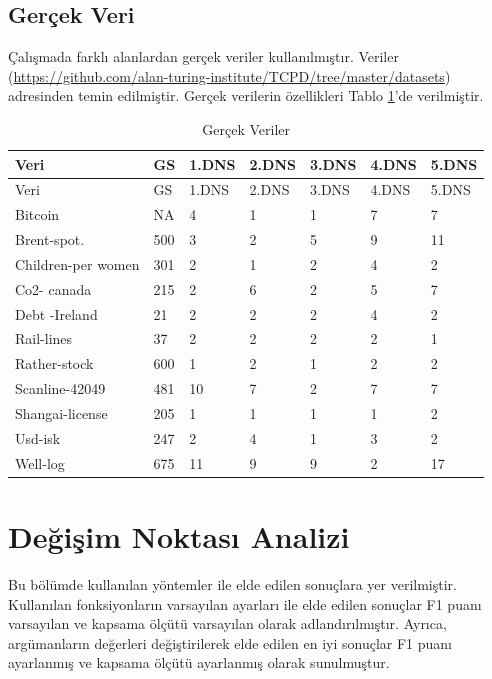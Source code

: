 \documentclass[12pt,twoside]{deuthesis}
\begin{document}
\hypertarget{geruxe7ek-veri}{%
\subsection{Gerçek Veri}\label{geruxe7ek-veri}}

Çalışmada farklı alanlardan gerçek veriler kullanılmıştır. Veriler (\url{https://github.com/alan-turing-institute/TCPD/tree/master/datasets}) adresinden temin edilmiştir. Gerçek verilerin özellikleri Tablo \ref{tab:ngercek}'de verilmiştir.

\begin{longtable}[]{@{}lllllll@{}}
\caption{\label{tab:ngercek} Gerçek Veriler}\tabularnewline
\toprule\noalign{}
Veri & GS & 1.DNS & 2.DNS & 3.DNS & 4.DNS & 5.DNS \\
\midrule\noalign{}
\endfirsthead
\toprule\noalign{}
Veri & GS & 1.DNS & 2.DNS & 3.DNS & 4.DNS & 5.DNS \\
\midrule\noalign{}
\endhead
\bottomrule\noalign{}
\endlastfoot
Bitcoin & NA & 4 & 1 & 1 & 7 & 7 \\
Brent-spot. & 500 & 3 & 2 & 5 & 9 & 11 \\
Children-per women & 301 & 2 & 1 & 2 & 4 & 2 \\
Co2- canada & 215 & 2 & 6 & 2 & 5 & 7 \\
Debt -Ireland & 21 & 2 & 2 & 2 & 4 & 2 \\
Rail-lines & 37 & 2 & 2 & 2 & 2 & 1 \\
Rather-stock & 600 & 1 & 2 & 1 & 2 & 2 \\
Scanline-42049 & 481 & 10 & 7 & 2 & 7 & 7 \\
Shangai-license & 205 & 1 & 1 & 1 & 1 & 2 \\
Usd-isk & 247 & 2 & 4 & 1 & 3 & 2 \\
Well-log & 675 & 11 & 9 & 9 & 2 & 17 \\
\end{longtable}

\hypertarget{deux11fiux15fim-noktasux131-analizi}{%
\section{Değişim Noktası Analizi}\label{deux11fiux15fim-noktasux131-analizi}}

Bu bölümde kullanılan yöntemler ile elde edilen sonuçlara yer verilmiştir. Kullanılan fonksiyonların varsayılan ayarları ile elde edilen sonuçlar F1 puanı varsayılan ve kapsama ölçütü varsayılan olarak adlandırılmıştır. Ayrıca, argümanların değerleri değiştirilerek elde edilen en iyi sonuçlar F1 puanı ayarlanmış ve kapsama ölçütü ayarlanmış olarak sunulmuştur.
\end{document}

